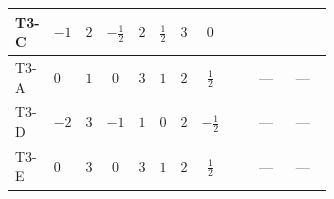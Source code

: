 \documentclass[8pt]{article}
\begin{document}
\begin{landscape}
\begin{longtable}{@{}llcccccc >{\raggedright\arraybackslash}p{0.21\linewidth} >{\raggedright\arraybackslash}p{0.21\linewidth} >{\raggedright\arraybackslash}p{0.21\linewidth}@{}}
\midrule
T3-C & $-1$ & $2$ & $-\frac{1}{2}$ & $2$ & $\frac{1}{2}$ & $3$ & $0$ & \scriptsize\adjustbox{max width=\linewidth}{$\begin{gathered} -12 \operatorname{Tr}\!\left({Y_u}\,\left({Y_u}\right)^{\dagger}\,{Y_u}\,\left({Y_u}\right)^{\dagger}\right)\end{gathered}$} & \scriptsize\adjustbox{max width=\linewidth}{$\begin{gathered} +8 {\lambda_{H^\dagger H^\dagger S_1^\dagger S_1^\dagger}} \left({\lambda_{H^\dagger H^\dagger S_1^\dagger S_1^\dagger}}\right)^{*}\end{gathered}$} & \scriptsize\adjustbox{max width=\linewidth}{$\begin{gathered} +4 {\lambda_{H H^\dagger S_1^\dagger S_2^\dagger}^{\rm Cross}} \left({\lambda_{H H^\dagger S_1^\dagger S_2^\dagger}^{\rm Cross}}\right)^{*}\end{gathered}$} \\
\midrule
T3-A & $0$ & $1$ & $0$ & $3$ & $1$ & $2$ & $\frac{1}{2}$ & \scriptsize\adjustbox{max width=\linewidth}{$\begin{gathered} -12 \operatorname{Tr}\!\left({Y_u}\,\left({Y_u}\right)^{\dagger}\,{Y_u}\,\left({Y_u}\right)^{\dagger}\right)\end{gathered}$} & --- & --- \\
\midrule
T3-D & $-2$ & $3$ & $-1$ & $1$ & $0$ & $2$ & $-\frac{1}{2}$ & \scriptsize\adjustbox{max width=\linewidth}{$\begin{gathered} -12 \operatorname{Tr}\!\left({Y_u}\,\left({Y_u}\right)^{\dagger}\,{Y_u}\,\left({Y_u}\right)^{\dagger}\right)\end{gathered}$} & --- & --- \\
\midrule
T3-E & $0$ & $3$ & $0$ & $3$ & $1$ & $2$ & $\frac{1}{2}$ & \scriptsize\adjustbox{max width=\linewidth}{$\begin{gathered} -12 \operatorname{Tr}\!\left({Y_u}\,\left({Y_u}\right)^{\dagger}\,{Y_u}\,\left({Y_u}\right)^{\dagger}\right)\end{gathered}$} & --- & --- \\
\midrule
\bottomrule
\end{longtable}
\clearpage

\end{landscape}
\end{document}
